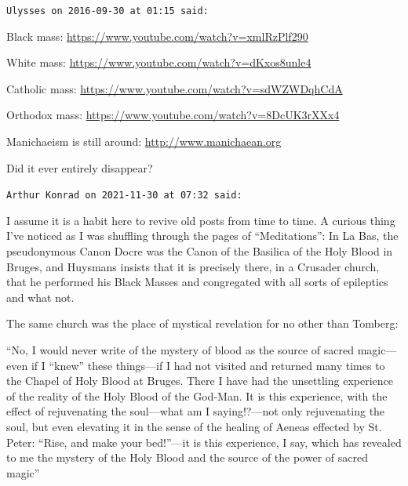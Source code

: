 \begin{footnotesize}
\begin{sffamily}
\hfill

\texttt{Ulysses on 2016-09-30 at 01:15 said:}

Black mass: \url{https://www.youtube.com/watch?v=xmlRzPlf290}

White mass: \url{https://www.youtube.com/watch?v=dKxos8unle4}

Catholic mass: \url{https://www.youtube.com/watch?v=sdWZWDqhCdA}

Orthodox mass: \url{https://www.youtube.com/watch?v=8DcUK3rXXx4}

Manichaeism is still around: \url{http://www.manichaean.org}

Did it ever entirely disappear?

\hfill

\texttt{Arthur Konrad on 2021-11-30 at 07:32 said:}

I assume it is a habit here to revive old posts from time to time. A curious thing I've noticed as I was shuffling through the pages of ``Meditations'': In La Bas, the pseudonymous Canon Docre was the Canon of the Basilica of the Holy Blood in Bruges, and Huysmans insists that it is precisely there, in a Crusader church, that he performed his Black Masses and congregated with all sorts of epileptics and what not.

The same church was the place of mystical revelation for no other than Tomberg:

``No, I would never write of the mystery of blood as the source of sacred magic---even if I ``knew'' these things---if I had not visited and returned many times to the Chapel of Holy Blood at Bruges. There I have had the unsettling experience of the reality of the Holy Blood of the God-Man. It is this experience, with the effect of rejuvenating the soul---what am I saying!?---not only rejuvenating the soul, but even elevating it in the sense of the healing of Aeneas effected by St. Peter: ``Rise, and make your bed!''---it is this experience, I say, which has revealed to me the mystery of the Holy Blood and the source of the power of sacred magic''


\hfill

\end{sffamily}
\end{footnotesize}

